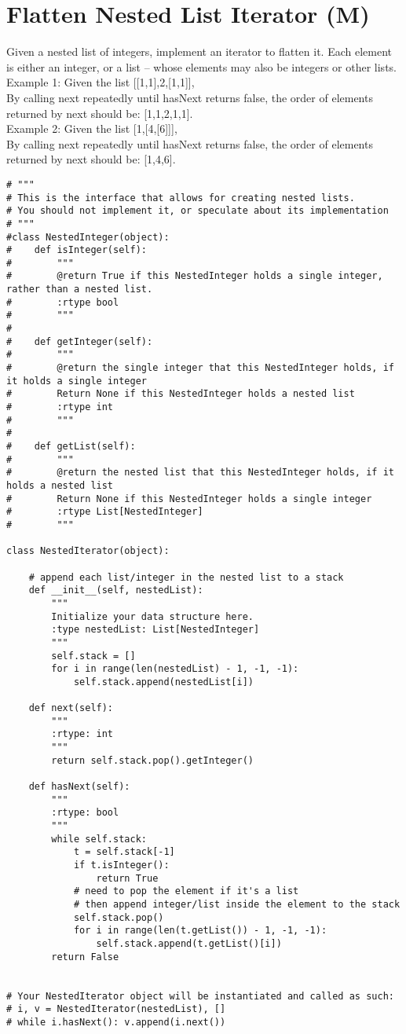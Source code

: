 \section{Flatten Nested List Iterator (M)}
Given a nested list of integers, implement an iterator to flatten it. Each element is either an integer, or a list -- whose elements may also be integers or other lists.\\

Example 1: Given the list [[1,1],2,[1,1]],\\
By calling next repeatedly until hasNext returns false, the order of elements returned by next should be: [1,1,2,1,1].\\

Example 2: Given the list [1,[4,[6]]],\\
By calling next repeatedly until hasNext returns false, the order of elements returned by next should be: [1,4,6]. \\
 
 \begin{lstlisting}
# """
# This is the interface that allows for creating nested lists.
# You should not implement it, or speculate about its implementation
# """
#class NestedInteger(object):
#    def isInteger(self):
#        """
#        @return True if this NestedInteger holds a single integer, rather than a nested list.
#        :rtype bool
#        """
#
#    def getInteger(self):
#        """
#        @return the single integer that this NestedInteger holds, if it holds a single integer
#        Return None if this NestedInteger holds a nested list
#        :rtype int
#        """
#
#    def getList(self):
#        """
#        @return the nested list that this NestedInteger holds, if it holds a nested list
#        Return None if this NestedInteger holds a single integer
#        :rtype List[NestedInteger]
#        """

class NestedIterator(object):

    # append each list/integer in the nested list to a stack
    def __init__(self, nestedList):
        """
        Initialize your data structure here.
        :type nestedList: List[NestedInteger]
        """
        self.stack = []
        for i in range(len(nestedList) - 1, -1, -1):
            self.stack.append(nestedList[i])
        
    def next(self):
        """
        :rtype: int
        """
        return self.stack.pop().getInteger()

    def hasNext(self):
        """
        :rtype: bool
        """
        while self.stack:
            t = self.stack[-1]
            if t.isInteger():
                return True
            # need to pop the element if it's a list
            # then append integer/list inside the element to the stack
            self.stack.pop()
            for i in range(len(t.getList()) - 1, -1, -1):
                self.stack.append(t.getList()[i])
        return False
        

# Your NestedIterator object will be instantiated and called as such:
# i, v = NestedIterator(nestedList), []
# while i.hasNext(): v.append(i.next())
 \end{lstlisting}


